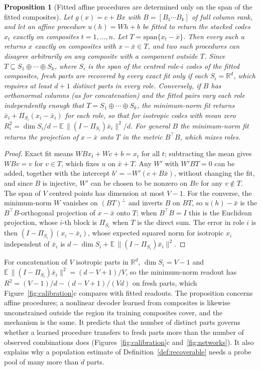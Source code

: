 \documentclass[10pt]{article}
\theoremstyle{plain}
\newtheorem{proposition}{Proposition}
\theoremstyle{remark}
\newcommand{\R}{\mathbb{R}}
\begin{document}
\begin{proposition}[Fitted affine procedures are determined only on the span of the fitted composites]
\label{prop:span}
Let $g(x) = c + Bx$ with $B = [B_1 \cdots B_k]$ of full column rank, and let an affine procedure $u(h) = Wh + b$ be fitted to return the stacked codes $x_t$ exactly on composites $t = 1, \ldots, n$. Let $T = \mathrm{span}\{x_t - \bar{x}\}$. Then every such $u$ returns $x$ exactly on composites with $x - \bar{x} \in T$, and two such procedures can disagree arbitrarily on any composite with a component outside $T$. Since $T \subseteq S_1 \oplus \cdots \oplus S_k$, where $S_i$ is the span of the centred role-$i$ codes of the fitted composites, fresh parts are recovered by every exact fit only if each $S_i = \R^d$, which requires at least $d + 1$ distinct parts in every role. Conversely, if $B$ has orthonormal columns (as for concatenation) and the fitted pairs vary each role independently enough that $T = S_1 \oplus \cdots \oplus S_k$, the minimum-norm fit returns $\bar{x}_i + \Pi_{S_i}(x_i - \bar{x}_i)$ for each role, so that for isotropic codes with mean zero $R^2_i = \dim S_i/d - \mathbb{E}\,\lVert (I - \Pi_{S_i})\bar{x}_i \rVert^2/d$. For general $B$ the minimum-norm fit returns the projection of $x - \bar{x}$ onto $T$ in the metric $B^{\top}B$, which mixes roles.
\end{proposition}

\begin{proof}
Exact fit means $WBx_t + Wc + b = x_t$ for all $t$; subtracting the mean gives $WBv = v$ for $v \in T$, which fixes $u$ on $\bar{x} + T$. Any $W'$ with $W'BT = 0$ can be added, together with the intercept $b' = -W'(c + B\bar{x})$, without changing the fit, and since $B$ is injective, $W'$ can be chosen to be nonzero on $B v$ for any $v \notin T$. The span of $V$ centred points has dimension at most $V - 1$. For the converse, the minimum-norm $W$ vanishes on $(BT)^{\perp}$ and inverts $B$ on $BT$, so $u(h) - \bar{x}$ is the $B^{\top}B$-orthogonal projection of $x - \bar{x}$ onto $T$; when $B^{\top}B = I$ this is the Euclidean projection, whose $i$-th block is $\Pi_{S_i}$ when $T$ is the direct sum. The error in role $i$ is then $(I - \Pi_{S_i})(x_i - \bar{x}_i)$, whose expected squared norm for isotropic $x_i$ independent of $\bar{x}_i$ is $d - \dim S_i + \mathbb{E}\,\lVert (I - \Pi_{S_i})\bar{x}_i \rVert^2$.
\end{proof}

\noindent
For concatenation of $V$ isotropic parts in $\R^d$, $\dim S_i = V - 1$ and $\mathbb{E}\,\lVert(I - \Pi_{S_i})\bar{x}_i\rVert^2 = (d - V + 1)/V$, so the minimum-norm readout has $R^2 = (V-1)/d - (d - V + 1)/(Vd)$ on fresh parts, which Figure~\ref{fig:calibration}c compares with fitted readouts. The proposition concerns affine procedures; a nonlinear decoder learned from composites is likewise unconstrained outside the region its training composites cover, and the mechanism is the same. It predicts that the number of distinct parts governs whether a learned procedure transfers to fresh parts more than the number of observed combinations does (Figures~\ref{fig:calibration}c and~\ref{fig:networks}). It also explains why a population estimate of Definition~\ref{def:recoverable} needs a probe pool of many more than $d$ parts.
\end{document}
